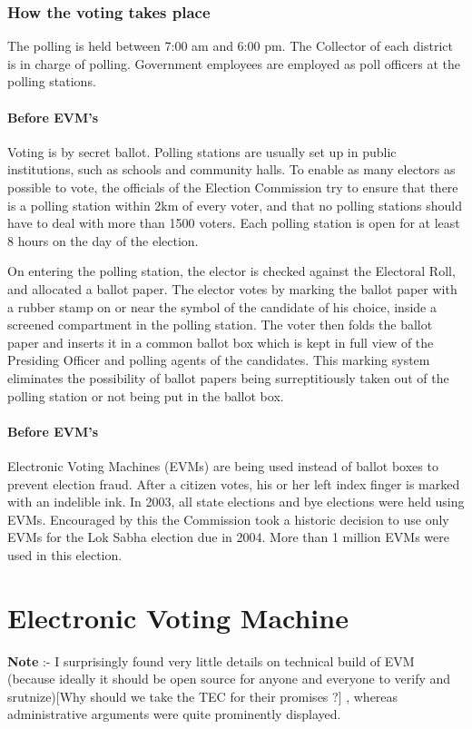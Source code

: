 \documentclass[12pt]{report}
\begin{document}
\subsection{How the voting takes place}

The polling is held between 7:00 am and 6:00 pm. The Collector of each district is in charge of polling. Government employees are employed as poll officers at the polling stations. 

\subsubsection{Before EVM's}
Voting is by secret ballot. Polling stations are usually set up in public institutions, such as schools and community halls. To enable as many electors as possible to vote, the officials of the Election Commission try to ensure that there is a polling station within 2km of every voter, and that no polling stations should have to deal with more than 1500 voters. Each polling station is open for at least 8 hours on the day of the election.

On entering the polling station, the elector is checked against the Electoral Roll, and allocated a ballot paper. The elector votes by marking the ballot paper with a rubber stamp on or near the symbol of the candidate of his choice, inside a screened compartment in the polling station. The voter then folds the ballot paper and inserts it in a common ballot box which is kept in full view of the Presiding Officer and polling agents of the candidates. This marking system eliminates the possibility of ballot papers being surreptitiously taken out of the polling station or not being put in the ballot box.

\subsubsection{Before EVM's}
Electronic Voting Machines (EVMs) are being used instead of ballot boxes to prevent election fraud. After a citizen votes, his or her left index finger is marked with an indelible ink.  In 2003, all state elections and bye elections were held using EVMs. Encouraged by this the Commission took a historic decision to use only EVMs for the Lok Sabha election due in 2004. More than 1 million EVMs were used in this election.

\chapter{Electronic Voting Machine}
\textbf{Note} :- I surprisingly found very little details on technical build of EVM (because ideally it should be open source for anyone and everyone to verify and srutnize)[Why should we take the TEC for their promises ?] , whereas administrative arguments were quite prominently displayed. 
\end{document}
